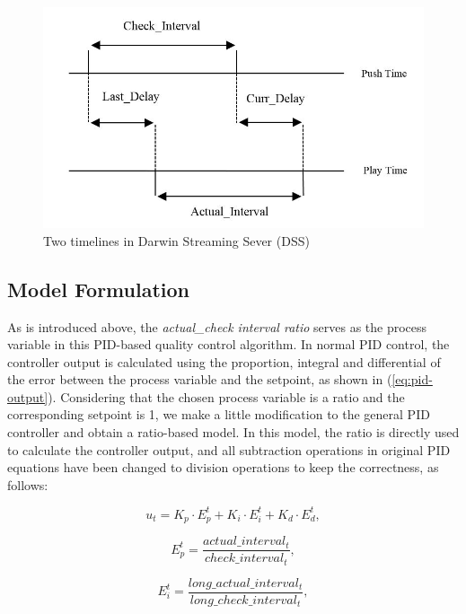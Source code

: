 \documentclass[journal]{IEEEtran}
\begin{document}
\begin{figure}[t]
\centering
\includegraphics[width = 0.9\linewidth]{Intervals.jpg}
\caption{Two timelines in Darwin Streaming Sever (DSS) \label{fig:intervals}}
\end{figure}

\subsection{Model Formulation}
\label{subsec:model}

As is introduced above, the \textit{actual\_check interval ratio} serves as the process variable in this PID-based quality control algorithm. In normal PID control, the controller output is calculated using the proportion, integral and differential of the error between the process variable and the setpoint, as shown in (\ref{eq:pid-output}). Considering that the chosen process variable is a ratio and the corresponding setpoint is 1, we make a little modification to the general PID controller and obtain a ratio-based model. In this model, the ratio is directly used to calculate the controller output, and all subtraction operations in original PID equations have been changed to division operations to keep the correctness, as follows:

\begin{equation}
\label{eq:ut}
{u_t} = {K_p} \cdot E_p^t + {K_i} \cdot E_i^t + {K_d} \cdot E_d^t ,
\end{equation}

\begin{equation}
\label{eq:ep}
E_p^t = \frac{{actual\_interva{l_t}}}{{check\_interva{l_t}}} ,
\end{equation}

\begin{equation}
\label{eq:ei}
E_i^t = \frac{{long\_actual\_interva{l_t}}}{{long\_check\_interva{l_t}}} ,
\end{equation}
\end{document}
